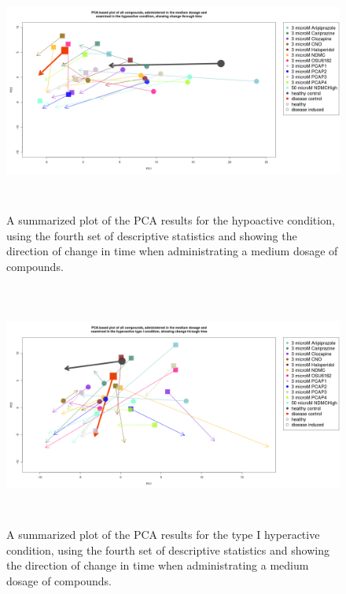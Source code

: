 \documentclass[a4paper,12pt]{article}
\begin{document}
\newpage
\begin{figure}[h!]
\begin{center}
\includegraphics[width=16cm,height=8cm]{All_together_3_microM_DarkApoLow_in_time_set4.png}
\caption{A summarized plot of the PCA results for the hypoactive condition, using the fourth set of descriptive statistics and showing the direction of change in time when administrating a medium dosage of compounds.}
\end{center}
\end{figure}
\newpage
\begin{figure}[h!]
\begin{center}
\includegraphics[width=16cm,height=8cm]{All_together_3_microM_DarkApoHigh_in_time_set4.png}
\caption{A summarized plot of the PCA results for the type I hyperactive condition, using the fourth set of descriptive statistics and showing the direction of change in time when administrating a medium dosage of compounds.}
\end{center}
\end{figure}
\end{document}
